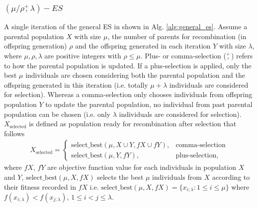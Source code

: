 \subsubsection{$(\mu/\rho\overset{+}{,}\lambda)-ES$ \cite{hansen2015evolution}}\label{sssec:def_ES}\hfill

A single iteration of the general ES in shown in Alg. \ref{alg:general_es}. Assume a parental population $X$ with size $\mu$, the number of parents for recombination (in offspring generation) $\rho$ and the offspring generated in each iteration $Y$ with size $\lambda$, where $\mu,\rho,\lambda$ are positive integers with $\rho \leq \mu$. Plus- or comma-selection ($\overset{+}{,}$) refers to how the parental population is updated. If a plus-selection is applied, only the best $\mu$ individuals are chosen considering both the parental population and the offspring generated in this iteration (i.e. totally $\mu+\lambda$ individuals are considered for selection). Whereas a comma-selection only chooses individuals from offspring population $Y$ to update the parental population, no individual from past parental population can be chosen (i.e. only $\lambda$ individuals are considered for selection).  $X_{\text{selected}}$ is defined as population ready for recombination after selection that follows
\begin{align}
X_{\text{selected}} = 
\begin{cases}
\text{select\_best}(\mu,X \cup Y,fX \cup fY), & \text{comma-selection}\\
\text{select\_best}(\mu,Y,fY) , & \text{plus-selection},
\end{cases}
\end{align}
where $fX$, $fY$ are objective function value for each individuals in population $X$ and $Y$, $\text{select\_best}(\mu,X,fX)$ selects the best $\mu$ individuals from $X$ according to their fitness recorded in $fX$ i.e. $\text{select\_best}(\mu,X,fX) = \{x_{i;\lambda}: 1 \leq i \leq \mu \}$ where $f(x_{i;\lambda}) < f(x_{j;\lambda})$, $1 \leq i < j \leq \lambda$.


